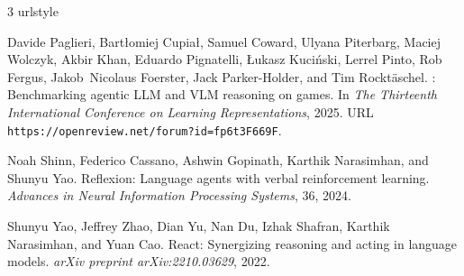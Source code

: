 \begin{thebibliography}{3}
\providecommand{\natexlab}[1]{#1}
\providecommand{\url}[1]{\texttt{#1}}
\expandafter\ifx\csname urlstyle\endcsname\relax
  \providecommand{\doi}[1]{doi: #1}\else
  \providecommand{\doi}{doi: \begingroup \urlstyle{rm}\Url}\fi

Davide Paglieri, Bart{\l}omiej Cupia{\l}, Samuel Coward, Ulyana Piterbarg, Maciej Wolczyk, Akbir Khan, Eduardo Pignatelli, {\L}ukasz Kuci{\'n}ski, Lerrel Pinto, Rob Fergus, Jakob~Nicolaus Foerster, Jack Parker-Holder, and Tim Rockt{\"a}schel.
: Benchmarking agentic {LLM} and {VLM} reasoning on games.
\newblock In \emph{The Thirteenth International Conference on Learning Representations}, 2025.
\newblock URL \url{https://openreview.net/forum?id=fp6t3F669F}.

Noah Shinn, Federico Cassano, Ashwin Gopinath, Karthik Narasimhan, and Shunyu Yao.
\newblock Reflexion: Language agents with verbal reinforcement learning.
\newblock \emph{Advances in Neural Information Processing Systems}, 36, 2024.

Shunyu Yao, Jeffrey Zhao, Dian Yu, Nan Du, Izhak Shafran, Karthik Narasimhan, and Yuan Cao.
\newblock React: Synergizing reasoning and acting in language models.
\newblock \emph{arXiv preprint arXiv:2210.03629}, 2022.

\end{thebibliography}
